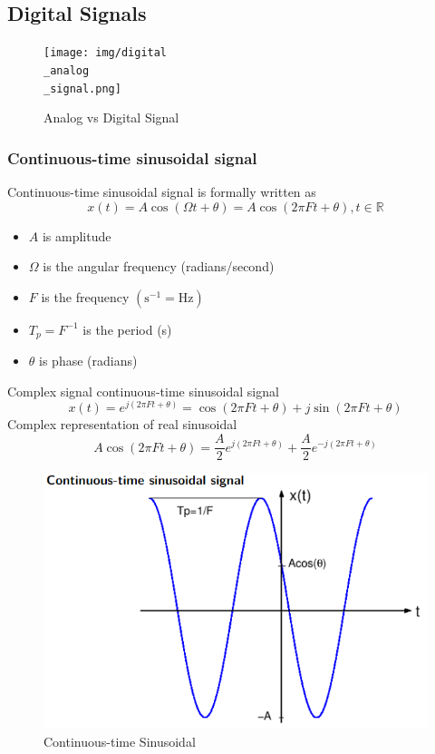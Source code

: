 \subsection{Digital Signals}

\begin{figure}[h!]
    \centering
    \texttt{[image: img/digital\\\_analog\\\_signal.png]}
    \caption{Analog vs Digital Signal}
    \label{fig:analog_digital}
\end{figure}

\subsubsection{Continuous-time sinusoidal signal}
Continuous-time sinusoidal signal is formally written as
$$
x(t)=A \cos (\Omega t+\theta)=A \cos (2 \pi F t+\theta), t \in \mathbb{R}
$$

\begin{itemize}
    \item $A$ is amplitude
    \item $\Omega$ is the angular frequency (radians/second)
    \item $F$ is the frequency $\left(\mathrm{s}^{-1}=\mathrm{Hz}\right)$
    \item $T_p=F^{-1}$ is the period (s)
    \item $\theta$ is phase (radians)
\end{itemize}
\noindent
Complex signal continuous-time sinusoidal signal
$$
x(t)=e^{j(2 \pi F t+\theta)}=\cos (2 \pi F t+\theta)+j \sin (2 \pi F t+\theta)
$$
Complex representation of real sinusoidal
$$
A \cos (2 \pi F t+\theta)=\frac{A}{2} e^{j(2 \pi F t+\theta)}+\frac{A}{2} e^{-j(2 \pi F t+\theta)}
$$

\begin{figure}[h!]
    \centering
    \includegraphics[width=\textwidth]{img/sinusoidal.PNG}
    \caption{Continuous-time Sinusoidal}
    \label{fig:sinusoidal}
\end{figure}

